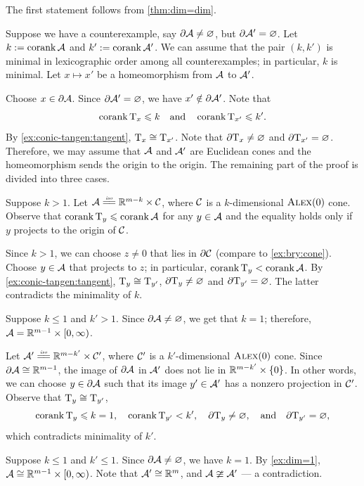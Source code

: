 The first statement follows from \ref{thm:dim=dim}.

Suppose we have a counterexample, say $\partial \mathcal{A}\ne \varnothing$, but $\partial \mathcal{A}'=\varnothing$.
Let $k\mathrel{:=}\operatorname{\rm corank}\nolimits \mathcal{A}$ and $k'\mathrel{:=}\operatorname{\rm corank}\nolimits \mathcal{A}'$.
We can assume that the pair $(k,k')$ is minimal in lexicographic order among all counterexamples;
in particular, $k$ is minimal.
Let $x\mapsto x'$ be a homeomorphism from $\mathcal{A}$ to $\mathcal{A}'$.

Choose $x\in \partial \mathcal{A}$.
Since $\partial \mathcal{A}'=\varnothing$, we have $x'\notin \partial \mathcal{A}'$.
Note that 
\[\operatorname{\rm corank}\nolimits \mathrm{T}_x\leqslant k
\quad\text{and}\quad
\operatorname{\rm corank}\nolimits \mathrm{T}_{x'}\leqslant k'.
\]
By \ref{ex:conic-tangen:tangent}, $\mathrm{T}_x\cong\mathrm{T}_{x'}$.
Note that $\partial \mathrm{T}_x\ne\varnothing$ and $\partial \mathrm{T}_{x'}=\varnothing$.
Therefore, we may assume that $\mathcal{A}$ and $\mathcal{A}'$ are Euclidean cones
and the homeomorphism sends the origin to the origin.
The remaining part of the proof is divided into three cases.

Suppose $k>1$.
Let $\spc{A}\iso \RR^{m-k}\times \spc{C}$, where $\mathcal{C}$ is a $k$-dimensional $\textup{\textsc{Alex}}(0)$ cone.
Observe that $\operatorname{\rm corank}\nolimits\mathrm{T}_y\leqslant\operatorname{\rm corank}\nolimits\mathcal{A}$ for any $y\in\mathcal{A}$ and the equality holds only if $y$ projects to the origin of $\mathcal{C}$.

Since $k>1$, we can choose $z\ne 0$ that lies in $\partial\mathcal{C}$ (compare to \ref{ex:bry:cone}).
Choose $y\in \mathcal{A}$ that projects to $z$;
in particular, $\operatorname{\rm corank}\nolimits\mathrm{T}_y<\operatorname{\rm corank}\nolimits\mathcal{A}$.
By \ref{ex:conic-tangen:tangent}, $\mathrm{T}_y\cong\mathrm{T}_{y'}$,
$\partial \mathrm{T}_y\ne\varnothing$ and $\partial \mathrm{T}_{y'}=\varnothing$.
The latter contradicts the minimality of $k$.

 Suppose $k\le1$ and $k'>1$.
Since $\partial \mathcal{A}\ne \varnothing$, we get that $k=1$;
therefore, $\mathcal{A}=\mathbb{R}^{m-1}\times[0,\infty)$.

Let $\spc{A}'\iso \RR^{m-k'}\times \spc{C}'$, where $\mathcal{C}'$ is a $k'$-dimensional $\textup{\textsc{Alex}}(0)$ cone.
Since $\partial\mathcal{A}\cong\mathbb{R}^{m-1}$,
the image of $\partial\mathcal{A}$ in $\mathcal{A}'$ does not lie in $\RR^{m-k'}\z\times\{0\}$.
In other words, we can choose $y\in \partial \mathcal{A}$ such that its image $y'\in \mathcal{A}'$ has a nonzero projection in $\mathcal{C}'$.
Observe that $\mathrm{T}_y\cong\mathrm{T}_{y'}$,
\[
\operatorname{\rm corank}\nolimits\mathrm{T}_y\leqslant k=1,
\quad
\operatorname{\rm corank}\nolimits\mathrm{T}_{y'}< k',
\quad
\partial \mathrm{T}_y\ne\varnothing,
\quad\text{and}\quad
\partial \mathrm{T}_{y'}= \varnothing,\]
which contradicts minimality of $k'$.

Suppose $k\le 1$ and $k'\le 1$.
Since $\partial \mathcal{A}\ne \varnothing$, we have $k=1$.
By \ref{ex:dim=1}, $\spc{A}\z\cong \RR^{m-1}\times[0,\infty)$.
Note that $\mathcal{A}'\cong\mathbb{R}^m$, and $\mathcal{A}\ncong\mathcal{A}'$ --- a contradiction.
\qeds

